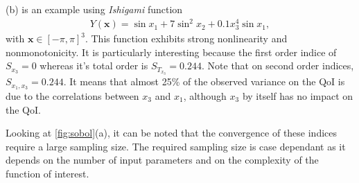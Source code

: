 (b) is an example using \textit{Ishigami} function~\cite{ishigami1990}
\begin{align}
Y(\mathbf{x}) = \sin x_1 + 7 \sin^2 x_2 + 0.1 x_3^4 \sin x_1,
\end{align}
\noindent with $\mathbf{x} \in [-\pi, \pi]^3$. This function exhibits strong nonlinearity and nonmonotonicity. It is particularly interesting because the first order indice of $S_{x_3} = 0$ whereas it's total order is $S_{T_{x_3}} = 0.244$. Note that on second order indices, $S_{x_1,x_3} = 0.244$. It means that almost 25\% of the observed variance on the QoI is due to the correlations between $x_3$ and $x_1$, although $x_3$ by itself has no impact on the QoI.

Looking at \cref{fig:sobol}(a), it can be noted that the convergence of these indices require a large sampling size. The required sampling size is case dependant as it depends on the number of input parameters and on the complexity of the function of interest.

